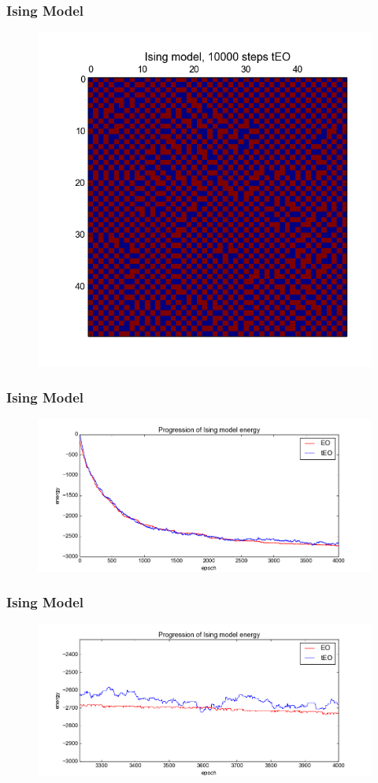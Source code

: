 \documentclass{beamer}
\begin{document}
\begin{frame}
  \frametitle{Ising Model}
  \begin{figure}
    \includegraphics{10000}
  \end{figure}
\end{frame}
\begin{frame}
  \frametitle{Ising Model}
  \begin{figure}
    \includegraphics{ising_energy_unzoomed}
  \end{figure}
\end{frame}

\begin{frame}
  \frametitle{Ising Model}
  \begin{figure}
    \includegraphics{ising_energy_zoomed}
  \end{figure}
\end{frame}
\end{document}
